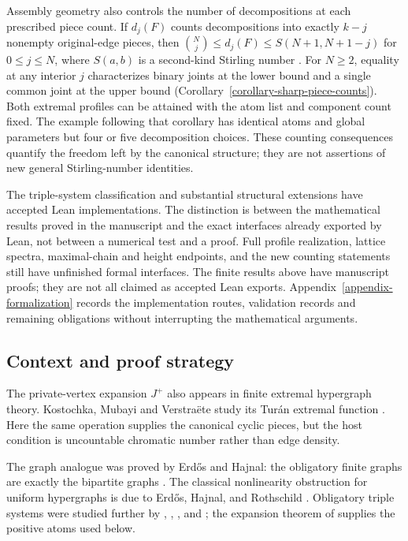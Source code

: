 \documentclass[a4paper,11pt,reqno]{amsart}
\theoremstyle{plain}
\theoremstyle{definition}
\theoremstyle{remark}
\begin{document}
Assembly geometry also controls the number of decompositions at each
prescribed piece count.  If \(d_j(F)\) counts decompositions into exactly
\(k-j\) nonempty original-edge pieces, then
\(\binom Nj\le d_j(F)\le S(N+1,N+1-j)\) for \(0\le j\le N\), where
\(S(a,b)\) is a second-kind Stirling number \citep{comtet1974}.
For \(N\ge2\), equality at any interior \(j\) characterizes binary joints
at the lower bound and a single common joint at the upper bound
(Corollary~\ref{corollary-sharp-piece-counts}).  Both extremal profiles can
be attained with the atom list and component count fixed.  The example
following that corollary has identical atoms and global parameters but
four or five decomposition choices.  These counting consequences quantify
the freedom left by the canonical structure; they are not assertions of
new general Stirling-number identities.

The triple-system classification and substantial structural extensions have accepted
Lean implementations.  The distinction is between the mathematical results
proved in the manuscript and the exact interfaces already exported by Lean,
not between a numerical test and a proof.  Full profile realization, lattice
spectra, maximal-chain and height endpoints, and the new counting statements
still have unfinished formal interfaces.  The finite results above have
manuscript proofs; they are not all claimed as accepted Lean exports.
Appendix~\ref{appendix-formalization} records the implementation routes,
validation records and remaining obligations without interrupting the
mathematical arguments.

\subsection*{Context and proof strategy}

The private-vertex expansion $J^+$ also appears in finite extremal
hypergraph theory.  Kostochka, Mubayi and Verstra{\"e}te study its
Tur{\'a}n extremal function \citep{kostochkamubayiverstraete2015}.
Here the same operation supplies the canonical cyclic pieces, but
the host condition is uncountable chromatic number rather than edge density.

The graph analogue was proved by Erdős and Hajnal: the obligatory finite
graphs are exactly the bipartite graphs
\citep[Corollary~5.6 and Theorem~7.4]{erdoshajnal1966}.  The classical
nonlinearity obstruction for uniform hypergraphs is due to Erdős, Hajnal,
and Rothschild \citep[Theorem~2, p.~532]{ehr1973}.  Obligatory triple
systems were studied further by \citet{egh1975}, \citet{komjath2001},
\citet{hajnalkomjath2008}, and \citet{komjath2008}; the expansion theorem of
\citet[Theorem~1.2]{reiher2024} supplies the positive atoms used below.
\end{document}
